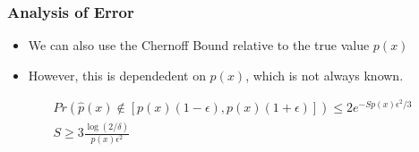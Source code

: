\documentclass{beamer}
\begin{document}
\begin{frame}
  \frametitle{Analysis of Error}
  \begin{itemize}
    \item We can also use the Chernoff Bound relative to the true value $p(x)$
    \item However, this is dependedent on $p(x)$, which is not always known.
  \end{itemize}
  \begin{gather*}
    Pr \left( \hat{p}(x) \not\in \left[p(x)(1 - \epsilon), p(x)(1 + \epsilon) \right] \right) \leq 2 e^{-S p(x) \epsilon^2 / 3} \\
    S \geq 3 \frac{\log \left(2 / \delta \right)}{p(x) \epsilon^2} \\
  \end{gather*}
\end{frame}

\end{document}
